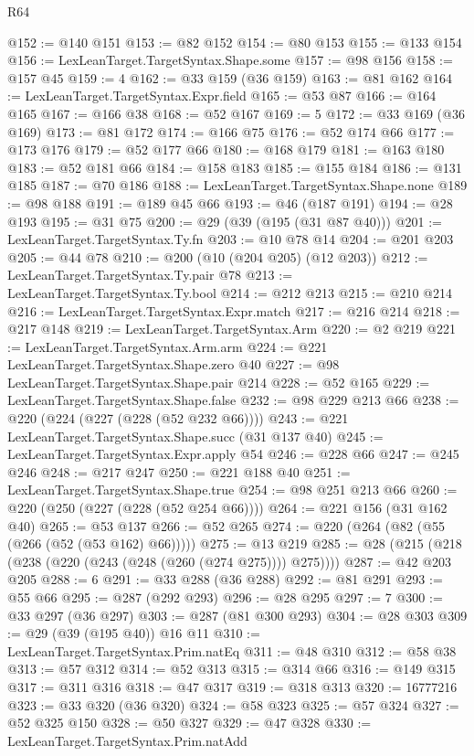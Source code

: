 \begin{lexlean}{R64}
\begin{coremodule}
@152 := @140 @151
@153 := @82 @152
@154 := @80 @153
@155 := @133 @154
@156 := LexLeanTarget.TargetSyntax.Shape.some
@157 := @98 @156
@158 := @157 @45
@159 := 4
@162 := @33 @159 (@36 @159)
@163 := @81 @162
@164 := LexLeanTarget.TargetSyntax.Expr.field
@165 := @53 @87
@166 := @164 @165
@167 := @166 @38
@168 := @52 @167
@169 := 5
@172 := @33 @169 (@36 @169)
@173 := @81 @172
@174 := @166 @75
@176 := @52 @174 @66
@177 := @173 @176
@179 := @52 @177 @66
@180 := @168 @179
@181 := @163 @180
@183 := @52 @181 @66
@184 := @158 @183
@185 := @155 @184
@186 := @131 @185
@187 := @70 @186
@188 := LexLeanTarget.TargetSyntax.Shape.none
@189 := @98 @188
@191 := @189 @45 @66
@193 := @46 (@187 @191)
@194 := @28 @193
@195 := @31 @75
@200 := @29 (@39 (@195 (@31 @87 @40)))
@201 := LexLeanTarget.TargetSyntax.Ty.fn
@203 := @10 @78 @14
@204 := @201 @203
@205 := @44 @78
@210 := @200 (@10 (@204 @205) (@12 @203))
@212 := LexLeanTarget.TargetSyntax.Ty.pair @78
@213 := LexLeanTarget.TargetSyntax.Ty.bool
@214 := @212 @213
@215 := @210 @214
@216 := LexLeanTarget.TargetSyntax.Expr.match
@217 := @216 @214
@218 := @217 @148
@219 := LexLeanTarget.TargetSyntax.Arm
@220 := @2 @219
@221 := LexLeanTarget.TargetSyntax.Arm.arm
@224 := @221 LexLeanTarget.TargetSyntax.Shape.zero @40
@227 := @98 LexLeanTarget.TargetSyntax.Shape.pair @214
@228 := @52 @165
@229 := LexLeanTarget.TargetSyntax.Shape.false
@232 := @98 @229 @213 @66
@238 := @220 (@224 (@227 (@228 (@52 @232 @66))))
@243 := @221 LexLeanTarget.TargetSyntax.Shape.succ (@31 @137 @40)
@245 := LexLeanTarget.TargetSyntax.Expr.apply @54
@246 := @228 @66
@247 := @245 @246
@248 := @217 @247
@250 := @221 @188 @40
@251 := LexLeanTarget.TargetSyntax.Shape.true
@254 := @98 @251 @213 @66
@260 := @220 (@250 (@227 (@228 (@52 @254 @66))))
@264 := @221 @156 (@31 @162 @40)
@265 := @53 @137
@266 := @52 @265
@274 := @220 (@264 (@82 (@55 (@266 (@52 (@53 @162) @66)))))
@275 := @13 @219
@285 := @28 (@215 (@218 (@238 (@220 (@243 (@248 (@260 (@274 @275)))) @275))))
@287 := @42 @203 @205
@288 := 6
@291 := @33 @288 (@36 @288)
@292 := @81 @291
@293 := @55 @66
@295 := @287 (@292 @293)
@296 := @28 @295
@297 := 7
@300 := @33 @297 (@36 @297)
@303 := @287 (@81 @300 @293)
@304 := @28 @303
@309 := @29 (@39 (@195 @40)) @16 @11
@310 := LexLeanTarget.TargetSyntax.Prim.natEq
@311 := @48 @310
@312 := @58 @38
@313 := @57 @312
@314 := @52 @313
@315 := @314 @66
@316 := @149 @315
@317 := @311 @316
@318 := @47 @317
@319 := @318 @313
@320 := 16777216
@323 := @33 @320 (@36 @320)
@324 := @58 @323
@325 := @57 @324
@327 := @52 @325 @150
@328 := @50 @327
@329 := @47 @328
@330 := LexLeanTarget.TargetSyntax.Prim.natAdd

\end{coremodule}
\end{lexlean}
